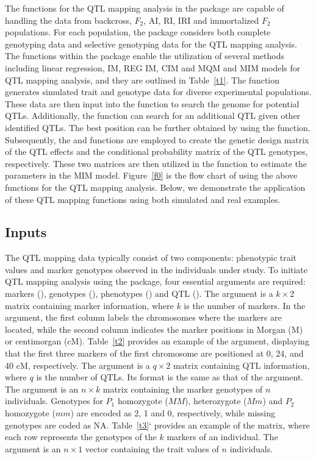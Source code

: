 The functions for the QTL mapping analysis in the  package are capable of handling the data from backcross, $F_2$, AI, RI, IRI and immortalized $F_2$ populations. For each population, the package considers both complete genotyping data and selective genotyping data for the QTL mapping analysis. The functions within the package enable the utilization of several methods including linear regression, IM, REG IM, CIM and MQM and MIM models for QTL mapping analysis, and they are outlined in Table~\ref{t1}. The  function generates simulated trait and genotype data for diverse experimental populations. These data are then input into the  function to search the genome for potential QTLs. Additionally, the  function can search for an additional QTL given other identified QTLs. The best position can be further obtained by using the  function. Subsequently, the  and  functions are employed to create the genetic design matrix of the QTL effects and the conditional probability matrix of the QTL genotypes, respectively. These two matrices are then utilized in the  function to estimate the parameters in the MIM model. Figure~\ref{f0} is the flow chart of using the above functions for the QTL mapping analysis. Below, we demonstrate the application of these QTL mapping functions using both simulated and real examples.

\subsection{Inputs}

The QTL mapping data typically consist of two components: phenotypic trait values and marker genotypes observed in the individuals under study. To initiate QTL mapping analysis using the  package, four essential arguments are required: markers (), genotypes (), phenotypes () and QTL (). The  argument is a $k\times2$ matrix containing marker information, where $k$ is the number of markers. In the  argument, the first column labels the chromosomes where the markers are located, while the second column indicates the marker positions in Morgan (M) or centimorgan (cM). Table~\ref{t2} provides an example of the  argument, displaying that the first three markers of the first chromosome are positioned at 0, 24, and 40 cM, respectively. The  argument is a $q\times2$ matrix containing QTL information, where $q$ is the number of QTLs. Its format is the same as that of the  argument. The  argument is an $n\times k$ matrix containing the marker genotypes of $n$ individuals. Genotypes for $P_{1}$ homozygote ($MM$), heterozygote ($Mm$) and $P_{2}$ homozygote ($mm$) are encoded as 2, 1 and 0, respectively, while missing genotypes are coded as NA. Table~\ref{t3}` provides an example of the  matrix, where each row represents the genotypes of the $k$ markers of an individual. The  argument is an $n\times1$ vector containing the trait values of $n$ individuals.

